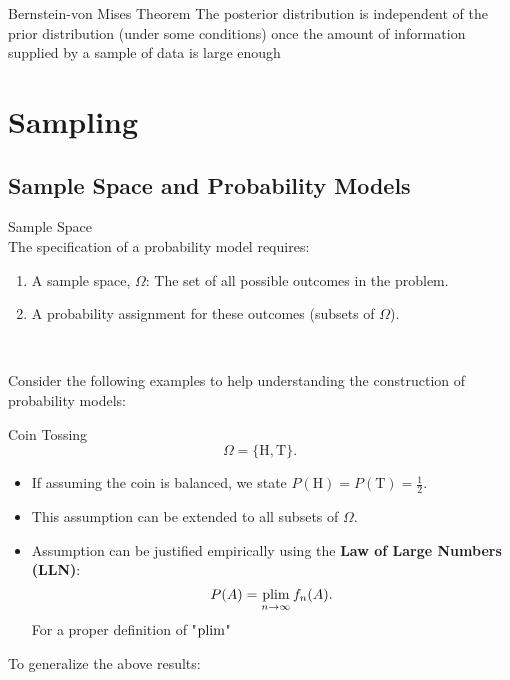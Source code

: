 \begin{thm}{Bernstein-von Mises Theorem}
The posterior distribution is independent of the prior
distribution (under some conditions) once the amount of information supplied by a sample of data
is large enough
\end{thm}

\newpage
\section{Sampling}
\subsection{Sample Space and Probability Models}
\begin{df}{Sample Space}\\
The specification of a probability model requires:
\begin{enumerate}
	\item A sample space, \(\Omega\): The set of all possible outcomes in the problem.
	\item A probability assignment for these outcomes (subsets of $\Omega$).
\end{enumerate}
\
\end{df}
Consider the following examples to help understanding the construction of probability models: 
\begin{eg}{Coin Tossing}
\[
\Omega = \{\text{H}, \text{T}\}.
\]
\begin{itemize}
    \item If assuming the coin is balanced, we state \(P(\text{H}) = P(\text{T}) = \frac{1}{2}\).
    \item This assumption can be extended to all subsets of \(\Omega\).
    \item Assumption can be justified empirically using the \textbf{Law of Large Numbers (LLN)}:  
    \[
    P(A) = \operatorname*{plim}_{n \to \infty} f_n(A).
    \]
    For a proper definition of "$\operatorname*{plim}$"
\end{itemize}
\end{eg}

To generalize the above results: \\

